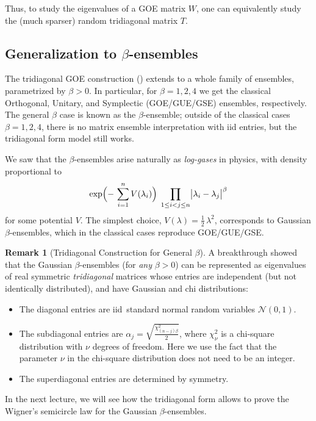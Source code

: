 \documentclass[letterpaper,11pt,oneside,reqno]{book}
\numberwithin{equation}{chapter}  %
\theoremstyle{definition}
\newtheorem{remark}[proposition]{Remark}
\begin{document}
Thus, to study the eigenvalues of a GOE matrix \(W\), one can equivalently study the (much sparser) random tridiagonal matrix \(T\).

\subsection{Generalization to \texorpdfstring{\(\beta\)}{beta}-ensembles}

The tridiagonal GOE construction ()
extends to a whole family of ensembles, parametrized by
\(\beta>0\).  In particular, for \(\beta = 1, 2, 4\) we get
the classical Orthogonal, Unitary, and Symplectic
(GOE/GUE/GSE) ensembles, respectively.  The general
$\beta$ case is known as the \(\beta\)-ensemble;
outside of the classical cases $\beta=1,2,4$, there
is no matrix ensemble interpretation with iid entries,
but the tridiagonal form model still works.

We saw that
the \(\beta\)-ensembles arise naturally as
\emph{log-gases} in physics, with density
proportional to
\[
  \exp\Bigl(-\,\sum_{i=1}^n V(\lambda_i)\Bigr)
  \;\prod_{1\le i<j\le n}\bigl|\lambda_i - \lambda_j\bigr|^\beta
\]
for some potential \(V\).  The simplest choice, \(V(\lambda)=\tfrac12\,\lambda^2\), corresponds to Gaussian \(\beta\)-ensembles, which in the classical cases reproduce GOE/GUE/GSE.

\begin{remark}[Tridiagonal Construction for General \(\beta\)]
	A breakthrough \cite{dumitriu2002matrix} showed that the
	Gaussian \(\beta\)-ensembles (for \emph{any} \(\beta>0\))
	can be represented
	as eigenvalues of real symmetric
	\emph{tridiagonal} matrices
	whose entries
	are independent
	(but not identically distributed), and have
	Gaussian and chi distributions:
\begin{itemize}
\item The diagonal entries are iid\
	standard normal random variables $\mathcal{N}(0,1)$.
\item The subdiagonal entries are
	$\alpha_j = \sqrt{\frac{\chi^2_{(n-j)\beta}}{2}}$,
	where $\chi^2_{\nu}$ is a chi-square distribution with $\nu$ degrees of freedom.
	Here we use the fact that the parameter $\nu$ in the chi-square distribution does not need to be an integer.
\item The superdiagonal entries are
	determined by symmetry.
\end{itemize}
\end{remark}

In the next lecture, we will see how the tridiagonal form
allows to prove the Wigner's semicircle law for the
Gaussian \(\beta\)-ensembles.
\end{document}
